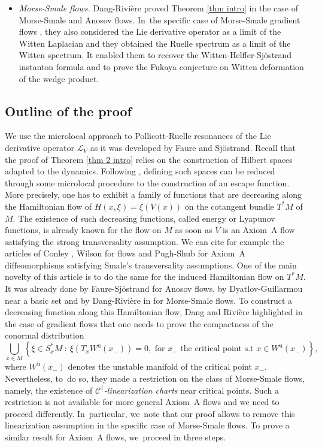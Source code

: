 \documentclass[JEP,XML,SOM,Unicode,NoEqCountersInSection,NoFloatCountersInSection,published]{cedram}
\newcommand{\ru}{\mathrm{u}}
\theoremstyle{definition}
\theoremstyle{plain}
\newcommand{\Ccal}{\mathcal{C}}
\newcommand{\Lie}{\mathcal{L}}
\begin{document}
\begin{itemize}
\item \emph{Morse-Smale flows.} Dang-Rivière \cite{DRIII} proved Theorem \ref{thm intro} in the case of Morse-Smale and Anosov flows. In~the specific case of Morse-Smale gradient flows \cite{DR_witten}, they also considered the Lie derivative operator as a limit of the Witten Laplacian and they obtained the Ruelle spectrum as a limit of the Witten spectrum. It enabled them to recover the Witten-Helffer-Sjöstrand instanton formula and to prove the Fukaya conjecture on Witten deformation of the wedge product.
\end{itemize}

\subsection{Outline of the proof} We use the microlocal approach to Pollicott-Ruelle resonances of the Lie derivative operator $\Lie_V$ as it was developed by Faure and Sjöstrand. Recall that the proof of Theorem \ref{thm 2 intro} relies on the construction of Hilbert spaces adapted to the dynamics. Following \cite{FS}, defining such spaces can be reduced through some microlocal procedure to the construction of an escape function. More precisely, one has to exhibit a family of functions that are decreasing along the Hamiltonian flow of $H(x,\xi)= \xi(V(x))$ on the cotangent bundle $T^*M$ of $M$. The existence of such decreasing functions, called energy or Lyapunov functions, is already known for the flow on $M$ as soon as $V$ is an Axiom~A flow satisfying the strong transversality assumption. We can cite for example the articles of Conley \cite{conley}, Wilson \cite{wilson} for flows and Pugh-Shub \cite{pugh-shub} for Axiom~A diffeomorphisms satisfying Smale's transversality assumptions. One of the main novelty of this article is to do the same for the induced Hamiltonian flow on $T^*M$. It was already done by Faure-Sjöstrand \cite{FS} for Anosov flows, by Dyatlov-Guillarmou \cite{dyatlov-guillarmou_2016} near a basic set and by Dang-Rivière in \cite{DR0,DRI} for Morse-Smale flows. To construct a decreasing function along this Hamiltonian flow, Dang and Rivière highlighted in the case of gradient flows \cite{DR0} that one needs to prove the compactness of the conormal distribution\enlargethispage{.5\baselineskip}
\[
\bigcup_{x \in M} \left\{ \xi \in S_x^* M \:: \: \xi (T_x W^\ru (x_{-})) = 0, \text{ for } x_- \text{ the critical point s.t } x \in W^\ru (x_{-}) \right\},
\]
where $W^\ru (x_-)$ denotes the unstable manifold of the critical point $x_-$. Nevertheless, to~do so, they made a restriction on the class of Morse-Smale flows, namely, the existence of $\Ccal^1$\textit{-linearization charts} near critical points. Such a restriction is not available for more general Axiom~A flows and we need to proceed differently. In~particular, we~note that our proof allows to remove this linearization assumption in the specific case of Morse-Smale flows. To prove a similar result for Axiom~A flows, we~proceed in three steps.
\end{document}
